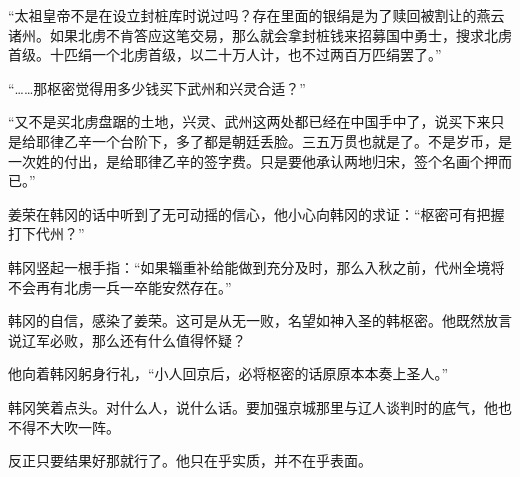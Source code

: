 “太祖皇帝不是在设立封桩库时说过吗？存在里面的银绢是为了赎回被割让的燕云诸州。如果北虏不肯答应这笔交易，那么就会拿封桩钱来招募国中勇士，搜求北虏首级。十匹绢一个北虏首级，以二十万人计，也不过两百万匹绢罢了。”

“……那枢密觉得用多少钱买下武州和兴灵合适？”

“又不是买北虏盘踞的土地，兴灵、武州这两处都已经在中国手中了，说买下来只是给耶律乙辛一个台阶下，多了都是朝廷丢脸。三五万贯也就是了。不是岁币，是一次姓的付出，是给耶律乙辛的签字费。只是要他承认两地归宋，签个名画个押而已。”

姜荣在韩冈的话中听到了无可动摇的信心，他小心向韩冈的求证：“枢密可有把握打下代州？”

韩冈竖起一根手指：“如果辎重补给能做到充分及时，那么入秋之前，代州全境将不会再有北虏一兵一卒能安然存在。”

韩冈的自信，感染了姜荣。这可是从无一败，名望如神入圣的韩枢密。他既然放言说辽军必败，那么还有什么值得怀疑？

他向着韩冈躬身行礼，“小人回京后，必将枢密的话原原本本奏上圣人。”

韩冈笑着点头。对什么人，说什么话。要加强京城那里与辽人谈判时的底气，他也不得不大吹一阵。

反正只要结果好那就行了。他只在乎实质，并不在乎表面。
